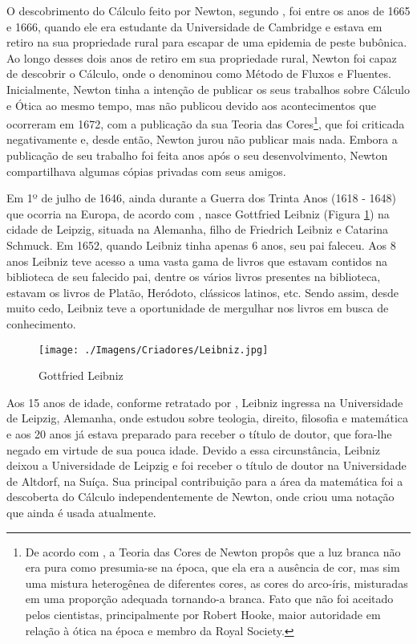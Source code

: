 \documentclass[
	12pt,				%
	openright,			%
    twoside,			%
	a4paper,			%
	chapter=TITLE,		%
	english,			%
	french,				%
	spanish,			%
	brazil				%
	]{abntex2}
\numberwithin{lema}{chapter}
\numberwithin{teorema}{chapter}
\numberwithin{definicao}{chapter}
\numberwithin{exemplo}{chapter}
\numberwithin{figure}{chapter}
\begin{document}
O descobrimento do Cálculo feito por Newton, segundo , foi entre os anos de 1665 e 1666, quando ele era estudante da Universidade de Cambridge e estava em retiro na sua propriedade rural para escapar de uma epidemia de peste bubônica. Ao longo desses dois anos de retiro em sua propriedade rural, Newton foi capaz de descobrir o Cálculo, onde o denominou como Método de Fluxos e Fluentes. Inicialmente, Newton tinha a intenção de publicar os seus trabalhos sobre Cálculo e Ótica ao mesmo tempo, mas não publicou devido aos acontecimentos que ocorreram em 1672, com a publicação da sua Teoria das Cores\footnote{De acordo com , a Teoria das Cores de Newton propôs que a luz branca não era pura como presumia-se na época, que ela era a ausência de cor, mas sim uma mistura heterogênea de diferentes cores, as cores do arco-íris, misturadas em uma proporção adequada tornando-a branca. Fato que não foi aceitado pelos cientistas, principalmente por Robert Hooke, maior autoridade em relação à ótica na época e membro da Royal Society.}, que foi criticada negativamente e, desde então, Newton jurou não publicar mais nada. Embora a publicação de seu trabalho foi feita anos após o seu desenvolvimento, Newton compartilhava algumas cópias privadas com seus amigos.

Em 1º de julho de 1646, ainda durante a Guerra dos Trinta Anos (1618 - 1648) que ocorria na Europa, de acordo com , nasce Gottfried Leibniz (Figura \ref{fig_leibniz}) na cidade de Leipzig, situada na Alemanha, filho de Friedrich Leibniz e Catarina Schmuck. Em 1652, quando Leibniz tinha apenas 6 anos, seu pai faleceu. Aos 8 anos Leibniz teve acesso a uma vasta gama de livros que estavam contidos na biblioteca de seu falecido pai, dentre os vários livros presentes na biblioteca, estavam os livros de Platão, Heródoto, clássicos latinos, etc. Sendo assim, desde muito cedo, Leibniz teve a oportunidade de mergulhar nos livros em busca de conhecimento.

\begin{figure}[h]
	\caption{Gottfried Leibniz}
	\centering
	\texttt{[image: ./Imagens/Criadores/Leibniz.jpg]}
	\label{fig_leibniz}
\end{figure}

Aos 15 anos de idade, conforme retratado por , Leibniz ingressa na Universidade de Leipzig, Alemanha, onde estudou sobre teologia, direito, filosofia e matemática e aos 20 anos já estava preparado para receber o título de doutor, que fora-lhe negado em virtude de sua pouca idade. Devido a essa circunstância, Leibniz deixou a Universidade de Leipzig e foi receber o título de doutor na Universidade de Altdorf, na Suíça. Sua principal contribuição para a área da matemática foi a descoberta do Cálculo independentemente de Newton, onde criou uma notação que ainda é usada atualmente. 
\end{document}
